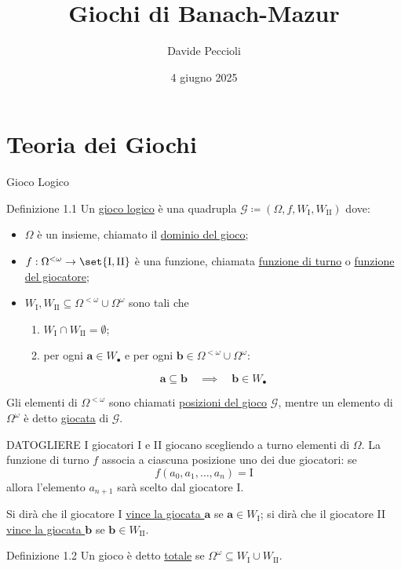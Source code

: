 \documentclass[babel]{beamer}
\institute[]{Università degli Studi di Torino}
\author{Davide Peccioli}
\date{4 giugno 2025}
\title{Giochi di Banach-Mazur}
\renewcommand{\href}[2]{#2}
\begin{document}
\maketitle
\section{Teoria dei Giochi}
\label{sec:org0098109}

\begin{frame}[label={sec:orgc28c64b}]{Gioco Logico}
\begin{block}{Definizione 1.1}
Un \uline{gioco logico} è una quadrupla \(\mathcal{G} \coloneqq (\Omega, f, W_{\text{I}}, W_{\text{II}})\) dove:
\begin{itemize}
\item \(\Omega\) è un \href{../../../../../../../org/roam/20250130104331-insieme_mk.org}{insieme}, chiamato il \uline{dominio del gioco};
\item \(f:\Omega^{<\omega}\to \set{\text{I},\text{II}}\) è una \href{../../../../../../../org/roam/20250202170607-classe_relazione_binaria.org}{funzione}, chiamata \uline{funzione di turno} o \uline{funzione del giocatore};
\item \(W_{\text{I}},W_{\text{II}} \subseteq \Omega^{<\omega}\cup \Omega^{\omega}\) sono tali che
\begin{enumerate}
\item \(W_{\text{I}}\cap W_{\text{II}} = \emptyset\);
\item per ogni \(\bm{a} \in W_{\bullet}\) e per ogni \(\bm{b} \in\Omega^{<\omega}\cup \Omega^{\omega}\):
\end{enumerate}
\begin{equation*}
  \bm{a} \subseteq \bm{b}\quad\implies\quad \bm{b} \in W_{\bullet}
\end{equation*}
\end{itemize}

Gli elementi di \(\Omega^{<\omega}\) sono chiamati \uline{posizioni del gioco} \(\mathcal{G}\), mentre un elemento di \(\Omega^{\omega}\) è detto \uline{giocata} di \(\mathcal{G}\).
\end{block}
\end{frame}
\begin{frame}[label={sec:orga493e04}]{DATOGLIERE}
I giocatori I e II giocano scegliendo a turno elementi di \(\Omega\). La funzione di turno \(f\) associa a ciascuna posizione uno dei due giocatori: se
\begin{equation*}
f(a_{0},a_{1},\dots,a_{n}) = \text{I}
\end{equation*}
allora l'elemento \(a_{n+1}\) sarà scelto dal giocatore I.

Si dirà che il giocatore I \uline{vince la giocata \(\bm{a}\)} se \(\bm{a} \in W_{\text{I}}\); si dirà che il giocatore II \uline{vince la giocata \(\bm{b}\)} se \(\bm{b} \in W_{\text{II}}\).
\begin{block}{Definizione 1.2}
Un gioco è detto \uline{totale} se \(\Omega^{\omega} \subseteq W_{\text{I}}\cup W_{\text{II}}\).
\end{block}
\end{frame}
\end{document}
